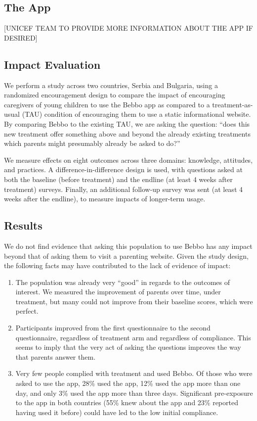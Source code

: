 \message{ !name(bebbo.tex)}\documentclass{article}
\begin{document}
\subsection*{The App}

[UNICEF TEAM TO PROVIDE MORE INFORMATION ABOUT THE APP IF DESIRED]

\subsection*{Impact Evaluation}

We perform a study across two countries, Serbia and Bulgaria, using a randomized encouragement design to compare the impact of encouraging caregivers of young children to use the Bebbo app as compared to a treatment-as-usual (TAU) condition of encouraging them to use a static informational website. By comparing Bebbo to the existing TAU, we are asking the question: “does this new treatment offer something above and beyond the already existing treatments which parents might presumably already be asked to do?”

We measure effects on eight outcomes across three domains: knowledge, attitudes, and practices. A difference-in-difference design is used, with questions asked at both the baseline (before treatment) and the endline (at least 4 weeks after treatment) surveys. Finally, an additional follow-up survey was sent (at least 4 weeks after the endline), to measure impacts of longer-term usage.

\subsection*{Results}

We do not find evidence that asking this population to use Bebbo has any impact beyond that of asking them to visit a parenting website. Given the study design, the following facts may have contributed to the lack of evidence of impact:

\begin{enumerate}
\item The population was already very “good” in regards to the outcomes of interest. We measured the improvement of parents over time, under treatment, but many could not improve from their baseline scores, which were perfect.
\item Participants improved from the first questionnaire to the second questionnaire, regardless of treatment arm and regardless of compliance. This seems to imply that the very act of asking the questions improves the way that parents answer them.
\item Very few people complied with treatment and used Bebbo. Of those who were asked to use the app, 28\% used the app, 12\% used the app more than one day, and only 3\% used the app more than three days. Significant pre-exposure to the app in both countries (55\% knew about the app and 23\% reported having used it before) could have led to the low initial compliance.
\end{enumerate}
\end{document}
